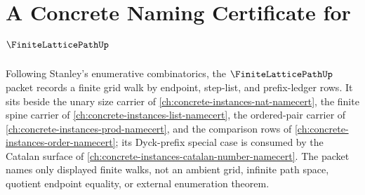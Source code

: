 \chapter{A Concrete Naming Certificate for $\FiniteLatticePathUp$}
\label{ch:concrete-instances-finite-lattice-path-namecert}

Following Stanley's enumerative combinatorics, the $\FiniteLatticePathUp$ packet records a finite grid walk by endpoint, step-list, and prefix-ledger rows. It sits beside the unary size carrier of \autoref{ch:concrete-instances-nat-namecert}, the finite spine carrier of \autoref{ch:concrete-instances-list-namecert}, the ordered-pair carrier of \autoref{ch:concrete-instances-prod-namecert}, and the comparison rows of \autoref{ch:concrete-instances-order-namecert}; its Dyck-prefix special case is consumed by the Catalan surface of \autoref{ch:concrete-instances-catalan-number-namecert}. The packet names only displayed finite walks, not an ambient grid, infinite path space, quotient endpoint equality, or external enumeration theorem.

